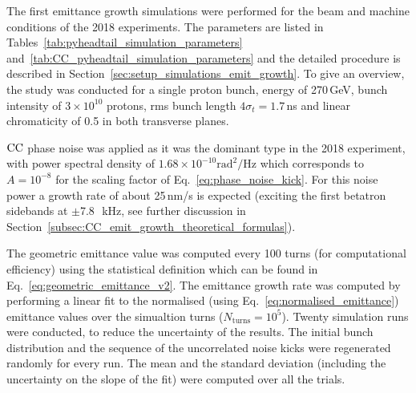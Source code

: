 The first emittance growth simulations were performed for the beam and machine conditions of the 2018 experiments. The parameters are listed in Tables~\ref{tab:pyheadtail_simulation_parameters} and~\ref{tab:CC_pyheadtail_simulation_parameters} and the detailed procedure is described in Section~\ref{sec:setup_simulations_emit_growth}. To give an overview, the study was conducted for a single proton bunch, energy of 270\,GeV, bunch intensity of $3 \times 10^{10}$ protons, rms bunch length $4 \sigma_t = 1.7$\,ns and linear chromaticity of 0.5 in both transverse planes. 

${\mathrm{CC}}$ phase noise was applied as it was the dominant type in the 2018 experiment, with power spectral density of $1.68 \times 10^{-10} \mathrm{rad^2/Hz}$ which corresponds to $A=10^{-8}$ for the scaling factor of Eq.~\eqref{eq:phase_noise_kick}. For this noise power a growth rate of about 25\,nm/s is expected (exciting the first betatron sidebands at $\pm$7.8~\,kHz, see further discussion in Section~\ref{subsec:CC_emit_growth_theoretical_formulas}). 

The geometric emittance value was computed every 100 turns (for computational efficiency) using the statistical definition which can be found in Eq.~\eqref{eq:geometric_emittance_v2}. The emittance growth rate was computed by performing a linear fit to the normalised (using Eq.~\eqref{eq:normalised_emittance}) emittance values over the simualtion turns ($N_\mathrm{turns}=10^5$). Twenty simulation runs were conducted, to reduce the uncertainty of the results. The initial bunch distribution and the sequence of the uncorrelated noise kicks were regenerated randomly for every run. The mean and the standard deviation (including the uncertainty on the slope of the fit) were computed over all the trials.  

